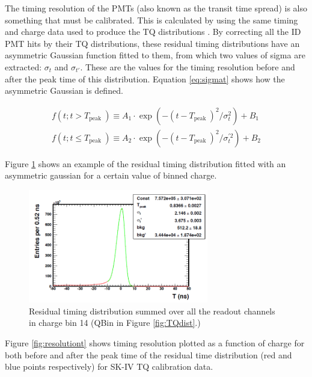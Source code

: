 The timing resolution of the PMTs (also known as the transit time spread) is also something that must be calibrated. This is calculated by using the same timing and charge data used to produce the TQ distributions \cite{dziomba2012study}. By correcting all the ID PMT hits by their TQ distributions, these residual timing distributions have an asymmetric Gaussian function fitted to them, from which two values of sigma are extracted: $\sigma_{t}$ and $\sigma_{t'}$. These are the values for the timing resolution before and after the peak time of this distribution. Equation \ref{eq:sigmat} shows how the asymmetric Gaussian is defined. 

\begin{align}
    f\left(t ; t>T_{\text {peak }}\right) \equiv A_{1} \cdot \exp \left(-\left(t-T_{\text {peak }}\right)^{2} / \sigma_{t}^{2}\right)+B_{1}\\
    f\left(t ; t \leq T_{\text {peak }}\right) \equiv A_{2} \cdot \exp \left(-\left(t-T_{\text {peak }}\right)^{2} / \sigma_{t}^{\prime 2}\right)+B_{2}
\label{eq:sigmat}
\end{align}

Figure \ref{fig:asygausst} shows an example of the residual timing distribution fitted with an asymmetric gaussian for a certain value of binned charge.

\begin{figure}
    \centering
    \includegraphics[width=0.7\textwidth]{Figures/asygausst.png}
\caption{Residual timing distribution summed over all the readout channels in charge bin 14 (QBin in Figure \ref{fig:TQdist}.)}
    \label{fig:asygausst}
\end{figure}



Figure \ref{fig:resolutiont} shows timing resolution  plotted as a function of charge for both before and after the peak time of the residual time distribution (red and blue points respectively) for SK-IV TQ calibration data. 

